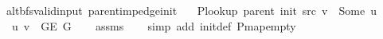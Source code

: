 \begin{isabellebody}
{}
\isamarkuptrue%
%
\endisatagdocument
{\isafolddocument}%
%
\isadelimdocument
%
\endisadelimdocument
{}\isamarkupfalse%
\ {\isacharparenleft}{\kern0pt}\ alt{\isacharunderscore}{\kern0pt}bfs{\isacharunderscore}{\kern0pt}valid{\isacharunderscore}{\kern0pt}input{\isacharparenright}{\kern0pt}\ parent{\isacharunderscore}{\kern0pt}imp{\isacharunderscore}{\kern0pt}edge{\isacharunderscore}{\kern0pt}init{\isacharcolon}{\kern0pt}\isanewline
\ \ \ {\isachardoublequoteopen}P{\isacharunderscore}{\kern0pt}lookup\ {\isacharparenleft}{\kern0pt}parent\ {\isacharparenleft}{\kern0pt}init\ src{\isacharparenright}{\kern0pt}{\isacharparenright}{\kern0pt}\ v\ {\isacharequal}{\kern0pt}\ Some\ u{\isachardoublequoteclose}\isanewline
\ \ \ {\isachardoublequoteopen}{\isacharbraceleft}{\kern0pt}u{\isacharcomma}{\kern0pt}\ v{\isacharbraceright}{\kern0pt}\ {\isasymin}\ G{\isachardot}{\kern0pt}E\ G{\isachardoublequoteclose}\isanewline
%
\isadelimproof
\ \ %
\endisadelimproof
%
\isatagproof
{}\isamarkupfalse%
\ assms\isanewline
\ \ \isamarkupfalse%
\ {\isacharparenleft}{\kern0pt}simp\ add{\isacharcolon}{\kern0pt}\ init{\isacharunderscore}{\kern0pt}def\ P{\isachardot}{\kern0pt}map{\isacharunderscore}{\kern0pt}empty{\isacharparenright}{\kern0pt}%
\endisatagproof
{\isafoldproof}%
%
\isadelimproof
%
\endisadelimproof
%
\isadelimdocument
%
\endisadelimdocument
%
\isatagdocument
%

\end{isabellebody}
